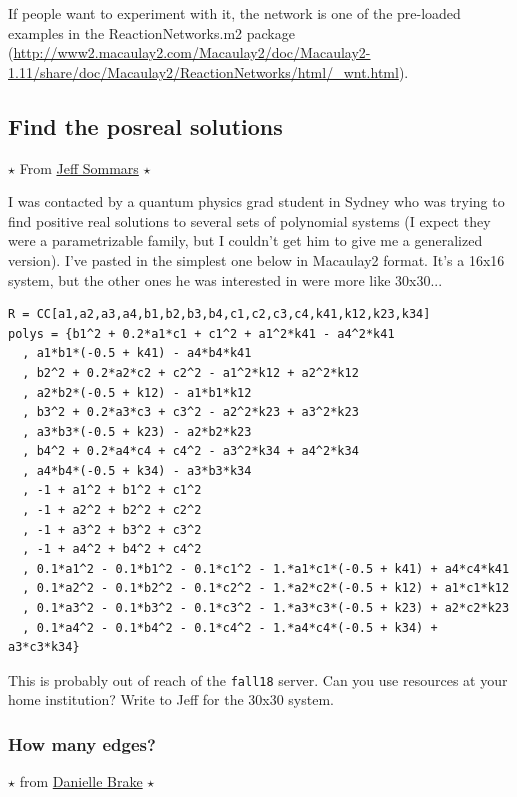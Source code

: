 \documentclass[letter,portrait]{article}
\newcommand{\1}{{\tt \_1}}
\newcommand{\2}{{\tt \_2}}
\begin{document}
If people want to experiment with it, the network is one of the pre-loaded examples in the ReactionNetworks.m2 package (\url{http://www2.macaulay2.com/Macaulay2/doc/Macaulay2-1.11/share/doc/Macaulay2/ReactionNetworks/html/_wnt.html}).






\subsection{Find the posreal solutions}

$\star$ From \href{http://homepages.math.uic.edu/~sommars/}{Jeff Sommars} $\star$

I was contacted by a quantum physics grad student in Sydney who was trying to find positive real solutions to several sets of polynomial systems (I expect they were a parametrizable family, but I couldn't get him to give me a generalized version). I've pasted in the simplest one below in Macaulay2 format. It's a 16x16 system, but the other ones he was interested in were more like 30x30...

\begin{verbatim}
R = CC[a1,a2,a3,a4,b1,b2,b3,b4,c1,c2,c3,c4,k41,k12,k23,k34]
polys = {b1^2 + 0.2*a1*c1 + c1^2 + a1^2*k41 - a4^2*k41
  , a1*b1*(-0.5 + k41) - a4*b4*k41
  , b2^2 + 0.2*a2*c2 + c2^2 - a1^2*k12 + a2^2*k12
  , a2*b2*(-0.5 + k12) - a1*b1*k12
  , b3^2 + 0.2*a3*c3 + c3^2 - a2^2*k23 + a3^2*k23
  , a3*b3*(-0.5 + k23) - a2*b2*k23
  , b4^2 + 0.2*a4*c4 + c4^2 - a3^2*k34 + a4^2*k34
  , a4*b4*(-0.5 + k34) - a3*b3*k34
  , -1 + a1^2 + b1^2 + c1^2
  , -1 + a2^2 + b2^2 + c2^2
  , -1 + a3^2 + b3^2 + c3^2
  , -1 + a4^2 + b4^2 + c4^2
  , 0.1*a1^2 - 0.1*b1^2 - 0.1*c1^2 - 1.*a1*c1*(-0.5 + k41) + a4*c4*k41
  , 0.1*a2^2 - 0.1*b2^2 - 0.1*c2^2 - 1.*a2*c2*(-0.5 + k12) + a1*c1*k12
  , 0.1*a3^2 - 0.1*b3^2 - 0.1*c3^2 - 1.*a3*c3*(-0.5 + k23) + a2*c2*k23
  , 0.1*a4^2 - 0.1*b4^2 - 0.1*c4^2 - 1.*a4*c4*(-0.5 + k34) + a3*c3*k34}

\end{verbatim}

This is probably out of reach of the {\tt fall18} server.  Can you use resources at your home institution?  Write to Jeff for the 30x30 system.


\subsubsection{How many edges?}


$\star$ from \href{https://danielleamethyst.org}{Danielle Brake} $\star$
\end{document}
